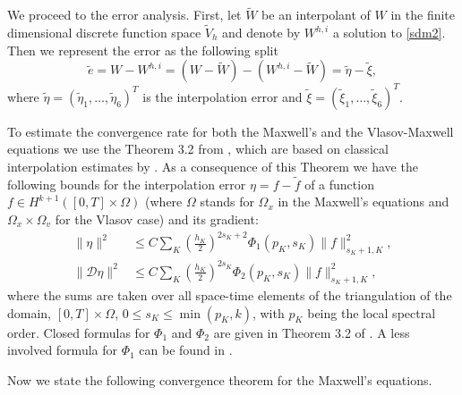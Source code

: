 \documentclass[reqno,a4paper]{amsart}
\theoremstyle{remark}
\numberwithin{equation}{section}
\def\et{\tilde{e}}
\def\etat{\tilde{\eta}}
\def\xit{\tilde{\xi}}
\begin{document}
We proceed to the error analysis.
First, let $\tilde{W}$ be an interpolant of $W$ in the finite dimensional
discrete function space $\tilde{V}_h$ and denote by $W^{h,i}$ 
a solution to \eqref{sdm2}.
Then we represent the error as the following split
\[
\et= W- W^{h,i} = (W-\tilde{W})-(W^{h,i}-\tilde{W}) = \etat- \xit,
\]
where $\etat=(\etat_1,\ldots,\etat_6)^T$ is the interpolation error 
and $\xit=(\xit_1,\ldots,\xit_6)^T$.

To estimate the convergence rate for both the Maxwell's and the Vlasov-Maxwell
equations we use the Theorem 3.2 from \cite{AsadSopas}, which are based on 
classical interpolation estimates by \cite{Ciarlet}. 
As a consequence of this Theorem we have the following bounds
for the interpolation error $\eta=f-\tilde f$ of a function 
$f\in H^{k+1}( [0,T] \times \Omega)$
(where $\Omega$ stands for $\Omega_x$ in the Maxwell's equations
and $\Omega_x\times\Omega_v$ for the Vlasov case)
 and its gradient:
\begin{align}\label{etabound1AS}
\|\eta\|^2&\leq C\sum_K\left(\frac{h_K}{2}\right)^{2s_K+2}
\Phi_1(p_K,s_K)\|f\|^2_{s_K+1,K},\\
\label{etabound2AS}\|\mathcal{D}\eta\|^2&
\leq C\sum_K\left(\frac{h_K}{2}\right)^{2s_K}
\Phi_2(p_K,s_K)\|f\|^2_{s_K+1,K},
\end{align}
where the sums are taken over all space-time 
elements of the triangulation of the domain, $ [0, T] \times \Omega$, 
$0\leq s_K\leq\min(p_K,k)$, with $p_K$ being the local spectral order.
Closed formulas for $ \Phi_1 $ and $ \Phi_2 $ are given in Theorem 3.2 of
\cite{AsadSopas}. A less involved formula for $ \Phi_1 $ can be found in
\cite{Houston_Schwab_Suli:2002}.


Now we state the following convergence theorem for the Maxwell's equations.
\end{document}
